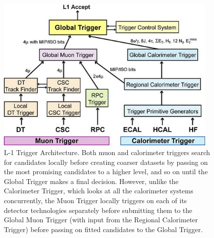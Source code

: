 \begin{figure}[htbp]
\begin{center}
\includegraphics[width=0.97\textwidth]{figs/cms/trigger.png}
\caption{L-1 Trigger Architecture. Both muon and calorimeter triggers search for candidates locally before creating coarser datasets by passing on the most promising candidates to a higher level, and so on until the Global Trigger makes a final decision. However, unlike the Calorimeter Trigger, which looks at all the calorimeter systems concurrently, the Muon Trigger locally triggers on each of its detector technologies separately before submitting them to the Global Muon Trigger (with input from the Regional Calorimeter Trigger) before passing on fitted candidates to the Global Trigger.}
\label{fig:trigger}
\end{center}
\end{figure}


